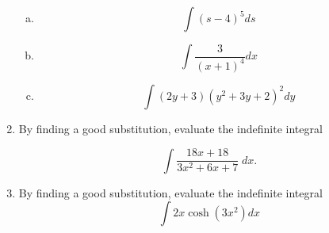 \documentclass[a4paper,12pt]{article}
\begin{document}
\begin{enumerate}
\begin{multicols}{2}
\begin{enumerate}[(a)]
		\item 
		\[ \int (s - 4)^5 ds \]
		\item 
		\[ \int 
		\frac{3}{(x + 1)^4 }dx\]
		\item 
		\[\int (2y + 3)(y^2 + 3y + 2)^2 dy\]
		
	\end{enumerate}
\end{multicols}

	\item  By finding a good substitution, evaluate the indefinite integral
	
	\[ \int \frac{18x + 18}{3x^2 + 6x + 7} \;dx.\]
	
	\item  By finding a good substitution, evaluate the indefinite integral
	\[ \int 2x \cosh(3x^2) dx \]
\end{enumerate}
\end{document}
